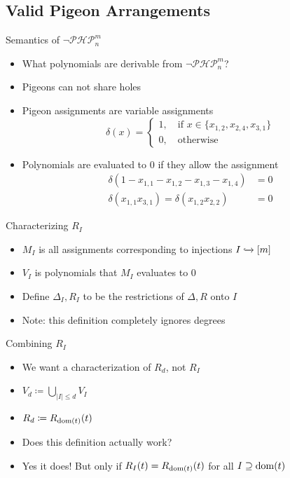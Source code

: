 \documentclass[xcolor={dvipsnames}, aspectratio=169, handout]{beamer}
\newcommand{\PHP}{\ensuremath{\neg \mathcal{PHP}^m_n}\xspace}
\begin{document}
\subsection{Valid Pigeon Arrangements}
\begin{frame}{Semantics of \PHP}
    \begin{itemize}[<+->]
        \item What polynomials are derivable from \PHP?
        \item Pigeons can not share holes
        \item Pigeon assignments are variable assignments
            $$\delta(x) = \begin{cases}
                1, \quad \text{if } x \in \{x_{1, 2}, x_{2, 4}, x_{3, 1}\}\\
                0, \quad \text{otherwise}
            \end{cases}$$
        \item Polynomials are evaluated to $0$ if they allow the assignment
            \begin{align*}
                \delta(1 - x_{1, 1} - x_{1, 2} - x_{1, 3} - x_{1, 4}) &= 0\\
                \delta(x_{1, 1} x_{3, 1}) = \delta(x_{1, 2} x_{2, 2}) &= 0
            \end{align*}
    \end{itemize}
\end{frame}

\begin{frame}{Characterizing $R_I$}
    \begin{itemize}[<.->]
        \item $M_I$ is all assignments corresponding to injections $I \xhookrightarrow{} [m]$
        \item $V_I$ is polynomials that $M_I$ evaluates to $0$
        \item Define $\Delta_I, R_I$ to be the restrictions of $\Delta, R$ onto $I$
        \item Note: this definition completely ignores degrees
    \end{itemize}
\end{frame}

\begin{frame}{Combining $R_I$}
    \begin{itemize}[<+->]
        \item We want a characterization of $R_d$, not $R_I$
        \item $V_d \coloneqq \bigcup_{|I| \leq d} V_I$
        \item $R_d \coloneqq R_{\operatorname{dom}(t)}(t)$
        \item Does this definition actually work?
        \item Yes it does! But only if $R_I(t) = R_{\operatorname{dom}(t)}(t)$ for all $I \supseteq \operatorname{dom}(t)$
    \end{itemize}
\end{frame}
\end{document}
